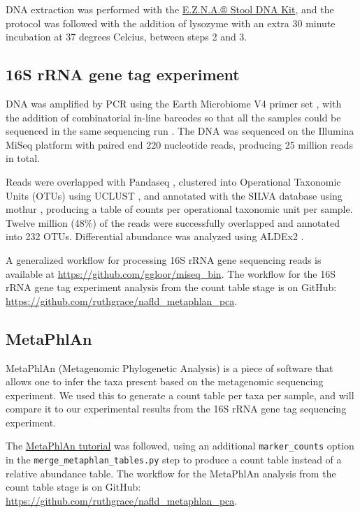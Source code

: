 DNA extraction was performed with the \href{http://omegabiotek.com/store/product/stool-dna-kit/}{E.Z.N.A.® Stool DNA Kit}, and the protocol was followed with the addition of lysozyme with an extra 30 minute incubation at 37 degrees Celcius, between steps 2 and 3.

\subsection{16S rRNA gene tag experiment}

DNA was amplified by PCR using the Earth Microbiome V4 primer set \cite{caporaso2012ultra}, with the addition of combinatorial in-line barcodes so that all the samples could be sequenced in the same sequencing run \cite{gloor2010microbiome}. The DNA was sequenced on the Illumina MiSeq platform with paired end 220 nucleotide reads, producing 25 million reads in total.

Reads were overlapped with Pandaseq \cite{masella2012pandaseq}, clustered into Operational Taxonomic Units (OTUs) using UCLUST \cite{edgar2010search}, and annotated with the SILVA database \cite{quast2013silva} using mothur \cite{schloss2009introducing}, producing a table of counts per operational taxonomic unit per sample. Twelve million (48\%) of the reads were successfully overlapped and annotated into 232 OTUs. Differential abundance was analyzed using ALDEx2 \cite{fernandes2014unifying}.

A generalized workflow for processing 16S rRNA gene sequencing reads is available at \url{https://github.com/ggloor/miseq_bin}. The workflow for the 16S rRNA gene tag experiment analysis from the count table stage is on GitHub: \url{https://github.com/ruthgrace/nafld_metaphlan_pca}.

\subsection{MetaPhlAn}

MetaPhlAn (Metagenomic Phylogenetic Analysis) \cite{segata2012metagenomic} is a piece of software that allows one to infer the taxa present based on the metagenomic sequencing experiment. We used this to generate a count table per taxa per sample, and will compare it to our experimental results from the 16S rRNA gene tag sequencing experiment.

The \href{https://bitbucket.org/nsegata/metaphlan/wiki/MetaPhlAn_Pipelines_Tutorial}{MetaPhlAn tutorial} was followed, using an additional \verb|marker_counts| option in the \verb|merge_metaphlan_tables.py| step to produce a count table instead of a relative abundance table. The workflow for the MetaPhlAn analysis from the count table stage is on GitHub: \url{https://github.com/ruthgrace/nafld_metaphlan_pca}.

